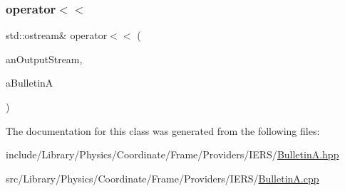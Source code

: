 \subsubsection{\texorpdfstring{operator$<$$<$}{operator<<}}
{\footnotesize\ttfamily std\+::ostream\& operator$<$$<$ (\begin{DoxyParamCaption}\item[{std\+::ostream \&}]{an\+Output\+Stream,  }\item[{const \hyperlink{classlibrary_1_1physics_1_1coord_1_1frame_1_1provider_1_1iers_1_1_bulletin_a}{BulletinA} \&}]{a\+BulletinA }\end{DoxyParamCaption})\hspace{0.3cm}{\ttfamily [friend]}}



The documentation for this class was generated from the following files\+:\begin{DoxyCompactItemize}
\item 
include/\+Library/\+Physics/\+Coordinate/\+Frame/\+Providers/\+I\+E\+R\+S/\hyperlink{_bulletin_a_8hpp}{Bulletin\+A.\+hpp}\item 
src/\+Library/\+Physics/\+Coordinate/\+Frame/\+Providers/\+I\+E\+R\+S/\hyperlink{_bulletin_a_8cpp}{Bulletin\+A.\+cpp}\end{DoxyCompactItemize}
